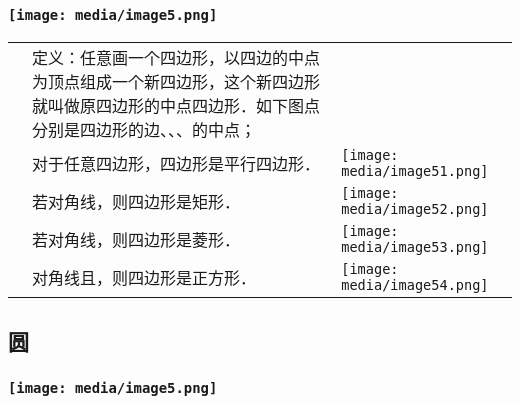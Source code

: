 \documentclass[a4paper,11pt,UTF8]{ctexart}
\begin{document}
\hypertarget{ux5b66ux79d1ux7f51www.zxxk.com--ux6559ux80b2ux8d44ux6e90ux95e8ux6237ux63d0ux4f9bux8bd5ux9898ux8bd5ux5377ux6559ux6848ux8bfeux4ef6ux6559ux5b66ux8bbaux6587ux7d20ux6750ux7b49ux5404ux7c7bux6559ux5b66ux8d44ux6e90ux5e93ux4e0bux8f7dux8fd8ux6709ux5927ux91cfux4e30ux5bccux7684ux6559ux5b66ux8d44ux8baf-16}{%
\subsubsection{\texorpdfstring{\protect\texttt{[image: media/image5.png]}}{学科网(www.zxxk.com)-\/-教育资源门户，提供试题试卷、教案、课件、教学论文、素材等各类教学资源库下载，还有大量丰富的教学资讯！}}\label{ux5b66ux79d1ux7f51www.zxxk.com--ux6559ux80b2ux8d44ux6e90ux95e8ux6237ux63d0ux4f9bux8bd5ux9898ux8bd5ux5377ux6559ux6848ux8bfeux4ef6ux6559ux5b66ux8bbaux6587ux7d20ux6750ux7b49ux5404ux7c7bux6559ux5b66ux8d44ux6e90ux5e93ux4e0bux8f7dux8fd8ux6709ux5927ux91cfux4e30ux5bccux7684ux6559ux5b66ux8d44ux8baf-16}}

\begin{longtable}[]{@{}lll@{}}
\toprule
\endhead
&
定义：任意画一个四边形，以四边的中点为顶点组成一个新四边形，这个新四边形就叫做原四边形的中点四边形．如下图点分别是四边形的边、、、的中点；
&\tabularnewline
& 对于任意四边形，四边形是平行四边形． &
\texttt{[image: media/image51.png]}\tabularnewline
& 若对角线，则四边形是矩形． &
\texttt{[image: media/image52.png]}\tabularnewline
& 若对角线，则四边形是菱形． &
\texttt{[image: media/image53.png]}\tabularnewline
& 对角线且，则四边形是正方形． &
\texttt{[image: media/image54.png]}\tabularnewline
\bottomrule
\end{longtable}

\hypertarget{ux5706}{%
\subsection{\texorpdfstring{ 圆}{ 圆}}\label{ux5706}}

\hypertarget{ux5b66ux79d1ux7f51www.zxxk.com--ux6559ux80b2ux8d44ux6e90ux95e8ux6237ux63d0ux4f9bux8bd5ux9898ux8bd5ux5377ux6559ux6848ux8bfeux4ef6ux6559ux5b66ux8bbaux6587ux7d20ux6750ux7b49ux5404ux7c7bux6559ux5b66ux8d44ux6e90ux5e93ux4e0bux8f7dux8fd8ux6709ux5927ux91cfux4e30ux5bccux7684ux6559ux5b66ux8d44ux8baf-17}{%
\subsubsection{\texorpdfstring{\protect\texttt{[image: media/image5.png]}}{学科网(www.zxxk.com)-\/-教育资源门户，提供试题试卷、教案、课件、教学论文、素材等各类教学资源库下载，还有大量丰富的教学资讯！}}\label{ux5b66ux79d1ux7f51www.zxxk.com--ux6559ux80b2ux8d44ux6e90ux95e8ux6237ux63d0ux4f9bux8bd5ux9898ux8bd5ux5377ux6559ux6848ux8bfeux4ef6ux6559ux5b66ux8bbaux6587ux7d20ux6750ux7b49ux5404ux7c7bux6559ux5b66ux8d44ux6e90ux5e93ux4e0bux8f7dux8fd8ux6709ux5927ux91cfux4e30ux5bccux7684ux6559ux5b66ux8d44ux8baf-17}}
\end{document}
